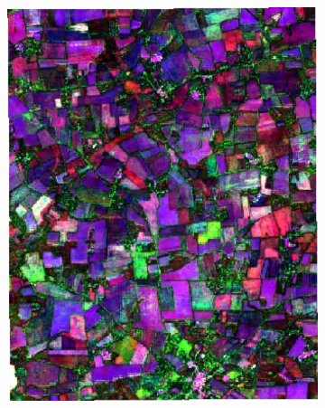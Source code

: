 \documentclass[journal,article,submit,pdftex,moreauthors]{Definitions/mdpi}
\providecommand{\DIFaddbeginFL}{} %
\providecommand{\DIFaddendFL}{} %
\providecommand{\DIFdelbeginFL}{} %
\providecommand{\DIFdelendFL}{} %
\begin{document}
\begin{figure}[H]
\begin{subfigure}[t]{0.23\linewidth}
\DIFdelendFL \DIFaddbeginFL \includegraphics[width=0.95\linewidth]{figures/aes_1_layer_mse_results/composites/composite_image_598481.pdf}
	\DIFaddendFL \caption{}
	\label{fig:color_map_c}
	\end{subfigure}
	\begin{subfigure}[t]{0.23\linewidth}
		\centering
	\DIFdelbeginFL %

\end{subfigure}
\end{figure}
\end{document}
